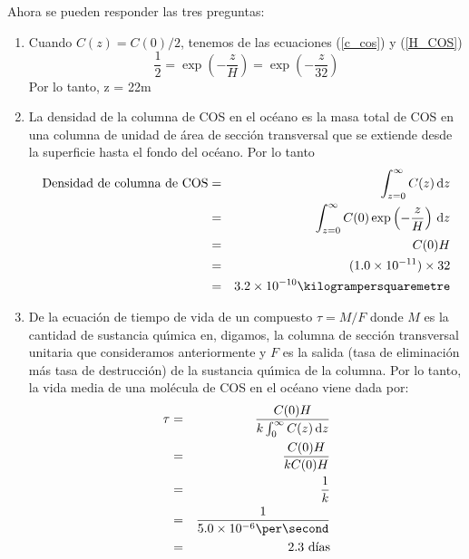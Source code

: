 \begin{example}
Ahora se pueden responder las tres preguntas:

\begin{enumerate}
\item Cuando $C(z)=C(0)/2$, tenemos de las ecuaciones (\ref{c_cos}) y  (\ref{H_COS}) 
\begin{equation*}
\frac{1}{2}=\exp\left(-\frac{z}{H} \right)=\exp\left( -\frac{z}{32}\right)
\end{equation*}
Por lo tanto, z = 22m
\item La densidad de la columna de COS en el oc\'eano es la masa total de COS en una columna de unidad de \'area de secci\'on transversal que se extiende desde la superficie hasta el fondo del oc\'eano. Por lo tanto
\begin{eqnarray*}
\textrm{Densidad de columna de COS} &=& \int_{z=0}^\infty C(z)\,\mathrm{d}z \\
       &=&  \int_{z=0}^\infty C(0)\exp\left(-\frac{z}{H}\right)\,\mathrm{d}z  \\
       &=& C(0)H \\
       &=& (1.0\times10^{-11})\times 32 \\
       &=& 3.2\times10^{-10}\kilogrampersquaremetre 
\end{eqnarray*}
%
\item De la ecuaci\'on de tiempo de vida de un compuesto $\tau=M/F$
donde $M$ es la cantidad de sustancia qu\'{\i}mica en, digamos, la columna de secci\'on transversal unitaria que consideramos anteriormente y $F$ es la salida (tasa de eliminaci\'on m\'as tasa de destrucci\'on) de la sustancia qu\'{\i}mica de la columna. Por lo tanto, la vida media de una mol\'ecula de COS en el oc\'eano viene dada por:
\begin{eqnarray*}
\tau & = & \frac{C(0)H}{k\int_0^\infty C(z)\,\mathrm{d}z } \\
& =& \frac{C(0)H}{kC(0)H}  \\ 
& =& \frac{1}{k}  \\ 
&=& \frac{1}{5.0\times10^{-6} \per\second}\\
&=& 2.3  \textrm{ d\'{\i}as} 
\end{eqnarray*}
\end{enumerate}
\end{example}

